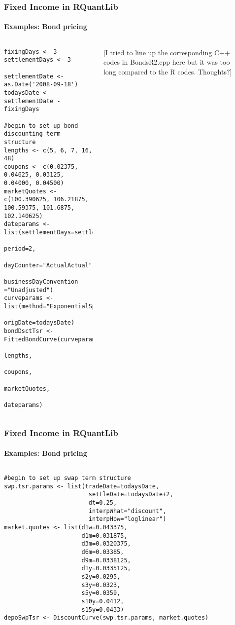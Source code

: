 \documentclass[smaller,compress]{beamer}
\begin{document}
\begin{frame}[fragile]
	\frametitle{Fixed Income in RQuantLib}
	\framesubtitle{Examples: Bond pricing}	
\begin{columns}[c] %
			\lstset{language=R,basicstyle=\tiny}
				\begin{lstlisting}
fixingDays <- 3
settlementDays <- 3

settlementDate <- as.Date('2008-09-18')
todaysDate <- settlementDate - fixingDays

#begin to set up bond discounting term structure
lengths <- c(5, 6, 7, 16, 48)
coupons <- c(0.02375, 0.04625, 0.03125, 0.04000, 0.04500)
marketQuotes <- c(100.390625, 106.21875, 100.59375, 101.6875, 102.140625)
dateparams <- list(settlementDays=settlementDays,
                   period=2, 
                   dayCounter="ActualActual", 
                   businessDayConvention ="Unadjusted")
curveparams <- list(method="ExponentialSplinesFitting", 
                    origDate=todaysDate)
bondDsctTsr <- FittedBondCurve(curveparams,
                               lengths,
                               coupons,
                               marketQuotes,
                               dateparams)
\end{lstlisting}

[I tried to line up the corresponding C++ codes in BondsR2.cpp 
here but it was too long compared to the R codes. Thoughts?]
\lstset{language=C++,basicstyle=\tiny}
	\begin{lstlisting}
	
	\end{lstlisting}
\end{columns}
\end{frame}

\begin{frame}[fragile]
	\frametitle{Fixed Income in RQuantLib}
	\framesubtitle{Examples: Bond pricing}	
\begin{columns}[c] %
			\lstset{language=R,basicstyle=\tiny}
				\begin{lstlisting}
#begin to set up swap term structure
swp.tsr.params <- list(tradeDate=todaysDate,
                        settleDate=todaysDate+2,
                        dt=0.25,
                        interpWhat="discount",
                        interpHow="loglinear")
market.quotes <- list(d1w=0.043375,
                      d1m=0.031875,
                      d3m=0.0320375,
                      d6m=0.03385,
                      d9m=0.0338125,
                      d1y=0.0335125,                      
                      s2y=0.0295,
                      s3y=0.0323,
                      s5y=0.0359,
                      s10y=0.0412,
                      s15y=0.0433)
depoSwpTsr <- DiscountCurve(swp.tsr.params, market.quotes)
\end{lstlisting}

\end{columns}
\end{frame}
\end{document}
